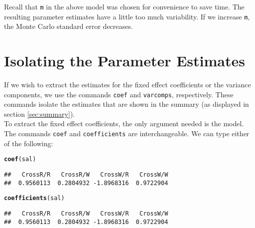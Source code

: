 \documentclass[11pt]{article}\usepackage[]{graphicx}\usepackage[]{color}
\makeatletter
\newcommand{\hlstd}[1]{\textcolor[rgb]{0.345,0.345,0.345}{#1}}%
\newcommand{\hlkwd}[1]{\textcolor[rgb]{0.737,0.353,0.396}{\textbf{#1}}}%
\newenvironment{kframe}{%
 \def\at@end@of@kframe{}%
 \ifinner\ifhmode%
  \def\at@end@of@kframe{\end{minipage}}%
  \begin{minipage}{\columnwidth}%
 \fi\fi%
 \def\FrameCommand##1{\hskip\@totalleftmargin \hskip-\fboxsep
 \colorbox{shadecolor}{##1}\hskip-\fboxsep
     \hskip-\linewidth \hskip-\@totalleftmargin \hskip\columnwidth}%
 \MakeFramed {\advance\hsize-\width
   \@totalleftmargin\z@ \linewidth\hsize
   \@setminipage}}%
 {\par\unskip\endMakeFramed%
 \at@end@of@kframe}
\newenvironment{knitrout}{}{} %
\makeatother
\begin{document}
Recall that \texttt{m}  in the above model was chosen for convenience to save time. The resulting parameter estimates have a little too much variability. If we increase \texttt{m}, the Monte Carlo standard error decreases. 





\section{Isolating the Parameter Estimates}\label{sec:coefs}
If we wish to extract the estimates for the fixed effect coefficients or the variance components, we use the commands \texttt{coef} and \texttt{varcomps}, respectively. These commands isolate the estimates that are shown in the summary (as displayed in section \ref{sec:summary}).\\

 To extract the fixed effect coefficients, the only argument needed is the model. The commands \texttt{coef} and \texttt{coefficients} are interchangeable. We can type either of the following:
\begin{knitrout}
\color{fgcolor}\begin{kframe}
\begin{alltt}
\hlkwd{coef}\hlstd{(sal)}
\end{alltt}
\begin{verbatim}
##   CrossR/R   CrossR/W   CrossW/R   CrossW/W 
##  0.9560113  0.2804932 -1.8968316  0.9722904
\end{verbatim}
\begin{alltt}
\hlkwd{coefficients}\hlstd{(sal)}
\end{alltt}
\begin{verbatim}
##   CrossR/R   CrossR/W   CrossW/R   CrossW/W 
##  0.9560113  0.2804932 -1.8968316  0.9722904
\end{verbatim}
\end{kframe}
\end{knitrout}
\end{document}
